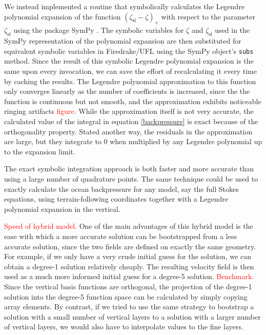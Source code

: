 \documentclass{article}
\theoremstyle{definition}
\theoremstyle{plain}
\begin{document}
We instead implemented a routine that symbolically calculates the Legendre polynomial expansion of the function $(\zeta_{\text{sl}} - \zeta)_+$ with respect to the parameter $\zeta_{\text{sl}}$ using the package SymPy \citep{sympy}.
The symbolic variables for $\zeta$ and $\zeta_{\text{sl}}$ used in the SymPy representation of the polynomial expansion are then substituted for equivalent symbolic variables in Firedrake/UFL using the SymPy object's \texttt{subs} method.
Since the result of this symbolic Legendre polynomial expansion is the same upon every invocation, we can save the effort of recalculating it every time by caching the results.
The Legendre polynomial approximation to this function only converges linearly as the number of coefficients is increased, since the the function is continuous but not smooth, and the approximation exhibits noticeable ringing artifacts \textcolor{red}{figure}.
While the approximation itself is not very accurate, the calculated value of the integral in equation \eqref{backpressure} is exact because of the orthogonality property.
Stated another way, the residuals in the approximation are large, but they integrate to 0 when multiplied by any Legendre polynomial up to the expansion limit.

The exact symbolic integration approach is both faster and more accurate than using a large number of quadrature points.
The same technique could be used to exactly calculate the ocean backpressure for any model, say the full Stokes equations, using terrain-following coordinates together with a Legendre polynomial expansion in the vertical.

\textcolor{red}{Speed of hybrid model.}
One of the main advantages of this hybrid model is the ease with which a more accurate solution can be bootstrapped from a less accurate solution, since the two fields are defined on exactly the same geometry.
For example, if we only have a very crude initial guess for the solution, we can obtain a degree-1 solution relatively cheaply.
The resulting velocity field is then used as a much more informed initial guess for a degree-5 solution.
\textcolor{red}{Benchmark.}
Since the vertical basis functions are orthogonal, the projection of the degree-1 solution into the degree-5 function space can be calculated by simply copying array elements.
By contrast, if we tried to use the same strategy to bootstrap a solution with a small number of vertical layers to a solution with a larger number of vertical layers, we would also have to interpolate values to the fine layers.
\end{document}
